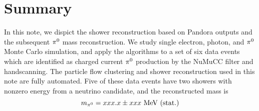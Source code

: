 \section{Summary}
\label{sec:summary}

In this note, we dispict the shower reconstruction based on Pandora
outputs and the subsequent ${\pi}^0$ mass reconstruction.
We study single electron, photon, and ${\pi}^0$ Monte Carlo
simulation, and apply the algorithms to a set of six data events
which are identified as charged current ${\pi}^0$ production
by the NuMuCC filter and handscanning.
The particle flow clustering and 
shower reconstruction used in 
this note are fully automated.
Five of these data events have two showers with nonzero energy
from a neutrino candidate, and the reconstructed mass is
\begin{equation}
\label{eq:pi0_mass_result}
m_{{\pi}^0} = xxx.x\pm xxx~\mbox{MeV (stat.)}
\end{equation}
